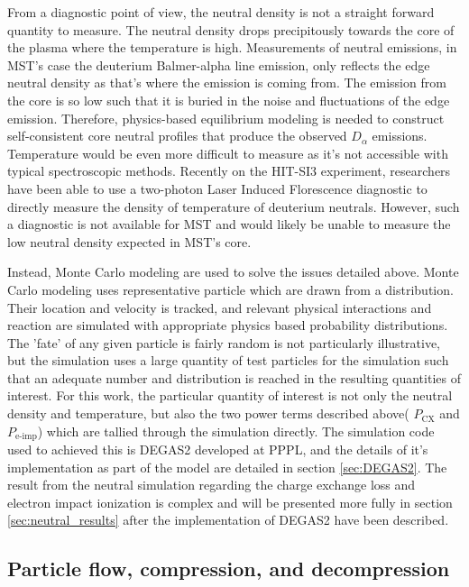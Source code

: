 \begin{refsection}
From a diagnostic point of view, the neutral density is not a straight forward quantity to measure. The neutral density drops precipitously towards the core of the plasma where the temperature is high. Measurements of neutral emissions, in MST's case the deuterium Balmer-alpha line emission, only reflects the edge neutral density as that's where the emission is coming from. The emission from the core is so low such that it is buried in the noise and fluctuations of the edge emission. Therefore, physics-based equilibrium modeling is needed to construct self-consistent core neutral profiles that produce the observed $D_{\alpha}$ emissions. Temperature would be even more difficult to measure as it's not accessible with typical spectroscopic methods. Recently on the HIT-SI3 experiment, researchers have been able to use a two-photon Laser Induced Florescence diagnostic to directly measure the density of temperature of deuterium neutrals\cite{Elliott2016}. However, such a diagnostic is not available for MST and would likely be unable to measure the low neutral density expected in MST's core. 

Instead, Monte Carlo modeling are used to solve the issues detailed above. Monte Carlo modeling uses representative particle which are drawn from a distribution. Their location and velocity is tracked, and relevant physical interactions and reaction are simulated with appropriate physics based probability distributions. The 'fate' of any given particle is fairly random is not particularly illustrative, but the simulation uses a large quantity of test particles for the simulation such that an adequate number and distribution is reached in the resulting quantities of interest. For this work, the particular quantity of interest is not only the neutral density and temperature, but also the two power terms described above( $P_{\text{CX}}$ and $P_{\text{e-imp}}$) which are tallied through the simulation directly. The simulation code used to achieved this is DEGAS2 developed at PPPL\cite{Stotler}, and the details of it's implementation as part of the model are detailed in section \ref{sec:DEGAS2}. The result from the neutral simulation regarding the charge exchange loss and electron impact ionization is complex and will be presented more fully in section \ref{sec:neutral_results} after the implementation of DEGAS2 have been described. 

\subsection{Particle flow, compression, and decompression}\label{sec:flow_effects}


\end{refsection}

